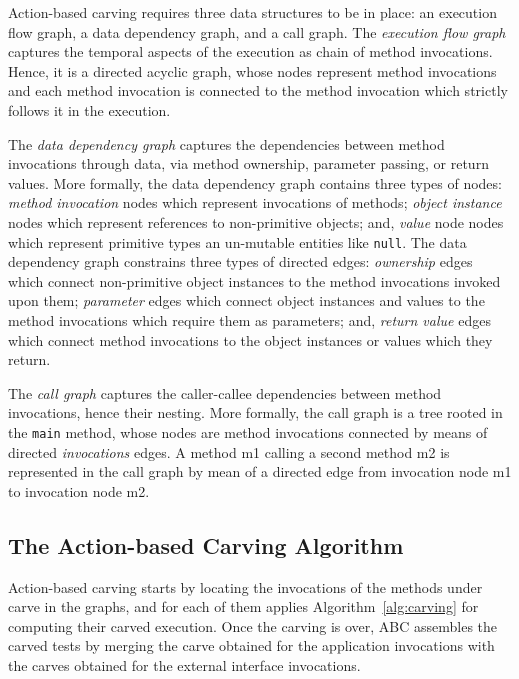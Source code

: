 \documentclass[10pt,conference]{IEEEtran}
\newcommand{\abc}{\textsf{ABC}\xspace}
\begin{document}
Action-based carving requires three data structures to be in place:
an execution flow graph, a data dependency graph, and a call graph.
%
The \emph{execution flow graph} captures the temporal aspects of the execution as chain of method invocations.
Hence, it is a directed acyclic graph, whose nodes represent method invocations and each method invocation is connected to the method invocation which strictly follows it in the execution.

The \emph{data dependency graph} captures the dependencies between method invocations through data, via method ownership, parameter passing, or return values.
%
More formally, the data dependency graph contains three types of nodes:
	\emph{method invocation} nodes which represent invocations of methods;
	\emph{object instance} nodes which represent references to non-primitive objects;
	and, \emph{value} node nodes which represent primitive types an un-mutable entities like \texttt{null}.
The data dependency graph constrains three types of directed edges:
	\emph{ownership} edges which connect non-primitive object instances to the method invocations invoked upon them;
	\emph{parameter} edges which connect object instances and values to the method invocations which require them as parameters;
	and, \emph{return value} edges which connect method invocations to the object instances or values which they return. 

The \emph{call graph} captures the caller-callee dependencies between method invocations, hence their nesting.
More formally, the call graph is a tree rooted in the \texttt{main} method, whose nodes are method invocations connected by means of directed \emph{invocations} edges. A method m1 calling a second method m2 is represented in the call graph by mean of a directed edge from invocation node m1 to invocation node m2.

\subsection{The Action-based Carving Algorithm}
Action-based carving starts by locating the invocations of
the methods under carve  in the graphs, and for each of them applies
Algorithm~\ref{alg:carving} for computing their carved execution.
%
Once the carving is over, \abc assembles the carved tests by merging
the carve obtained for the application invocations with the carves obtained for
the external interface invocations.
\end{document}

